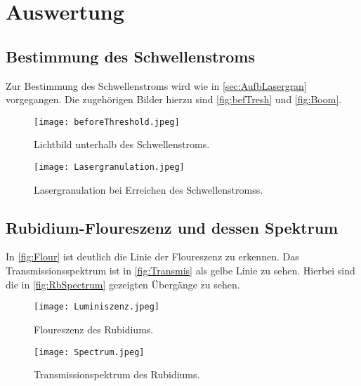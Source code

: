 \section{Auswertung}
\label{sec:Auswertung}

%
\subsection{Bestimmung des Schwellenstroms}
\label{sec:Ausw1}
Zur Bestimmung des Schwellenstroms wird wie in \autoref{sec:AufbLasergran} vorgegangen. Die zugehörigen Bilder hierzu sind \autoref{fig:befTresh} und \autoref{fig:Boom}.

\begin{figure}
    \centering
        \texttt{[image: beforeThreshold.jpeg]}
        \caption{Lichtbild unterhalb des Schwellenstroms.}
        \label{fig:befTresh} 
\end{figure}
\begin{figure}
    \centering
        \texttt{[image: Lasergranulation.jpeg]}
        \caption{Lasergranulation bei Erreichen des Schwellenstromss.}
        \label{fig:Boom} 
\end{figure}

\subsection{Rubidium-Floureszenz und dessen Spektrum}
\label{sec:Ausw2}
In \autoref{fig:Flour} ist deutlich die Linie der Floureszenz zu erkennen. Das Transmissionsspektrum ist in \autoref{fig:Transmis} als gelbe Linie zu sehen. Hierbei sind die in \autoref{fig:RbSpectrum} gezeigten Übergänge zu sehen.

\begin{figure}
    \centering
        \texttt{[image: Luminiszenz.jpeg]}
        \caption{Floureszenz des Rubidiums.}
        \label{fig:Flour} 
\end{figure}

\begin{figure}
    \centering
        \texttt{[image: Spectrum.jpeg]}
        \caption{Transmissionspektrum des Rubidiums.}
        \label{fig:Transmis} 
\end{figure}
